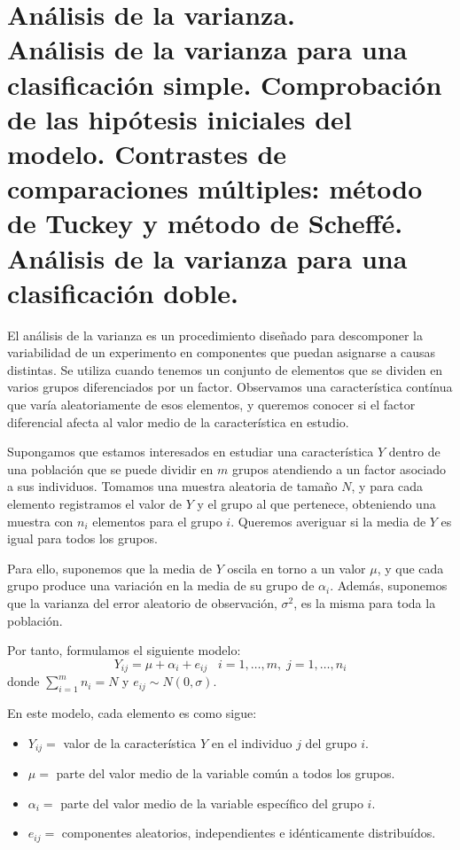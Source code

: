 \chapter[An\'alisis de la varianza.]{An\'alisis de la varianza. \\
\normalsize An\'alisis de la varianza para una clasificaci\'on simple. Comprobaci\'on de las hip\'otesis iniciales del modelo. Contrastes de comparaciones m\'ultiples: m\'etodo de Tuckey y m\'etodo de Scheff\'e. An\'alisis de la varianza para una clasificaci\'on doble.}

El an\'alisis de la varianza es un procedimiento dise\~nado para descomponer la variabilidad de un experimento en componentes que puedan asignarse a causas distintas. Se utiliza cuando tenemos un conjunto de elementos que se dividen en varios grupos diferenciados por un factor. Observamos una caracter\'istica cont\'inua que var\'ia aleatoriamente de esos elementos, y queremos conocer si el factor diferencial afecta al valor medio de la caracter\'istica en estudio.


Supongamos que estamos interesados en estudiar una caracter\'istica $Y$ dentro de una poblaci\'on que se puede dividir en $m$ grupos atendiendo a un factor asociado a sus individuos. Tomamos una muestra aleatoria de tama\~no $N$, y para cada elemento registramos el valor de $Y$ y el grupo al que pertenece, obteniendo una muestra con $n_i$ elementos para el grupo $i$. Queremos averiguar si la media de $Y$ es igual para todos los grupos.

Para ello, suponemos que la media de $Y$ oscila en torno a un valor $\mu$, y que cada grupo produce una variaci\'on en la media de su grupo de $\alpha_i$. Adem\'as, suponemos que la varianza del error aleatorio de observaci\'on, $\sigma^2$, es la misma para toda la poblaci\'on.

Por tanto, formulamos el siguiente modelo:
\[Y_{ij}=\mu+\alpha_i+e_{ij}\;\;\;i=1,\ldots,m,\;j=1,\ldots,n_i\]
donde $\sum_{i=1}^{m}n_i=N$ y $e_{ij}\sim N(0,\sigma)$.

En este modelo, cada elemento es como sigue:
\begin{itemize}
\item $Y_{ij} =$ valor de la caracter\'istica $Y$ en el individuo $j$ del grupo $i$.
\item $\mu =$ parte del valor medio de la variable com\'un a todos los grupos.
\item $\alpha_i = $ parte del valor medio de la variable espec\'ifico del grupo $i$.
\item $e_{ij}=$ componentes aleatorios, independientes e id\'enticamente distribu\'idos.
\end{itemize}

